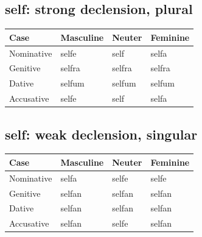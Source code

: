 \subsection*{self: strong declension, plural}

\par\begingroup
\fontsize{10.5}{13.2}\selectfont
\setlength{\LTleft}{0pt}\setlength{\LTright}{\fill}
\noindent
\begin{tabular}{@{}>{\raggedright\arraybackslash}p{28.89mm}>{\raggedright\arraybackslash}p{28.89mm}>{\raggedright\arraybackslash}p{28.89mm}>{\raggedright\arraybackslash}p{28.89mm}@{}}
\toprule
\textbf{Case} & \textbf{Masculine} & \textbf{Neuter} & \textbf{Feminine} \\
\midrule
Nominative & selfe & self & selfa \\
Genitive & selfra & selfra & selfra \\
Dative & selfum & selfum & selfum \\
Accusative & selfe & self & selfa \\
\bottomrule
\end{tabular}
\par\endgroup

\subsection*{self: weak declension, singular}

\par\begingroup
\fontsize{10.5}{13.2}\selectfont
\setlength{\LTleft}{0pt}\setlength{\LTright}{\fill}
\noindent
\begin{tabular}{@{}>{\raggedright\arraybackslash}p{28.89mm}>{\raggedright\arraybackslash}p{28.89mm}>{\raggedright\arraybackslash}p{28.89mm}>{\raggedright\arraybackslash}p{28.89mm}@{}}
\toprule
\textbf{Case} & \textbf{Masculine} & \textbf{Neuter} & \textbf{Feminine} \\
\midrule
Nominative & selfa & selfe & selfe \\
Genitive & selfan & selfan & selfan \\
Dative & selfan & selfan & selfan \\
Accusative & selfan & selfe & selfan \\
\bottomrule
\end{tabular}
\par\endgroup

